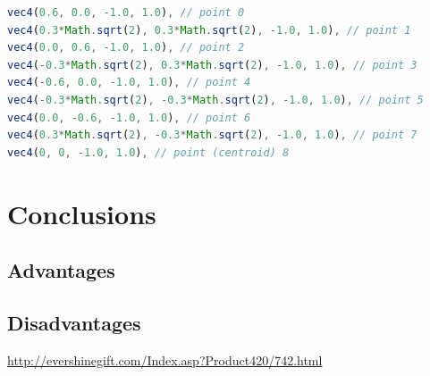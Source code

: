\documentclass[12pt,a4paper]{article}
\begin{document}
\begin{lstlisting}[caption={Bottom Octagon example vertex defintions},label={lst:bottomoctagon},language=JavaScript]
vec4(0.6, 0.0, -1.0, 1.0), // point 0
vec4(0.3*Math.sqrt(2), 0.3*Math.sqrt(2), -1.0, 1.0), // point 1
vec4(0.0, 0.6, -1.0, 1.0), // point 2
vec4(-0.3*Math.sqrt(2), 0.3*Math.sqrt(2), -1.0, 1.0), // point 3
vec4(-0.6, 0.0, -1.0, 1.0), // point 4
vec4(-0.3*Math.sqrt(2), -0.3*Math.sqrt(2), -1.0, 1.0), // point 5
vec4(0.0, -0.6, -1.0, 1.0), // point 6
vec4(0.3*Math.sqrt(2), -0.3*Math.sqrt(2), -1.0, 1.0), // point 7
vec4(0, 0, -1.0, 1.0), // point (centroid) 8
\end{lstlisting}


\section{Conclusions}
\subsection{Advantages}
%
\subsection{Disadvantages}


\begin{thebibliography}{1}

   \url{http://evershinegift.com/Index.asp?Product420/742.html}

\end{thebibliography}
\end{document}
